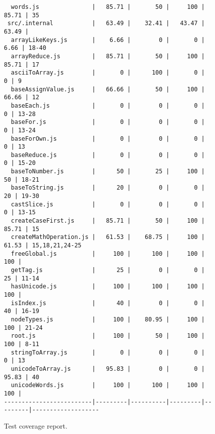 \documentclass[]{article}
\begin{document}
\begin{figure}[H]
\begin{lstlisting}
  words.js               |   85.71 |       50 |     100 |   85.71 | 35                
 src/.internal           |   63.49 |    32.41 |   43.47 |   63.49 |                   
  arrayLikeKeys.js       |    6.66 |        0 |       0 |    6.66 | 18-40             
  arrayReduce.js         |   85.71 |       50 |     100 |   85.71 | 17                
  asciiToArray.js        |       0 |      100 |       0 |       0 | 9                 
  baseAssignValue.js     |   66.66 |       50 |     100 |   66.66 | 12                
  baseEach.js            |       0 |        0 |       0 |       0 | 13-28             
  baseFor.js             |       0 |        0 |       0 |       0 | 13-24             
  baseForOwn.js          |       0 |        0 |       0 |       0 | 13                
  baseReduce.js          |       0 |        0 |       0 |       0 | 15-20             
  baseToNumber.js        |      50 |       25 |     100 |      50 | 18-21             
  baseToString.js        |      20 |        0 |       0 |      20 | 19-30             
  castSlice.js           |       0 |        0 |       0 |       0 | 13-15             
  createCaseFirst.js     |   85.71 |       50 |     100 |   85.71 | 15                
  createMathOperation.js |   61.53 |    68.75 |     100 |   61.53 | 15,18,21,24-25    
  freeGlobal.js          |     100 |      100 |     100 |     100 |                   
  getTag.js              |      25 |        0 |       0 |      25 | 11-14             
  hasUnicode.js          |     100 |      100 |     100 |     100 |                   
  isIndex.js             |      40 |        0 |       0 |      40 | 16-19             
  nodeTypes.js           |     100 |    80.95 |     100 |     100 | 21-24             
  root.js                |     100 |       50 |     100 |     100 | 8-11              
  stringToArray.js       |       0 |        0 |       0 |       0 | 13                
  unicodeToArray.js      |   95.83 |        0 |       0 |   95.83 | 40                
  unicodeWords.js        |     100 |      100 |     100 |     100 |                   
-------------------------|---------|----------|---------|---------|-------------------
\end{lstlisting}
	\caption{Test coverage report.}
	\label{lst:coverage-report}
\end{figure}

\newpage


\end{document}

